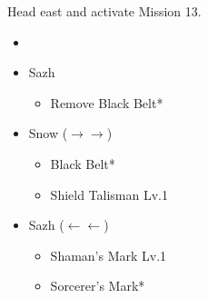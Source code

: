Head east and activate Mission 13.

\begin{menu}
	\begin{itemize}
		\paradigm
		\begin{itemize}
			\item {}%
				  {\paradigmline{\syn}{(\sab)}{\com}}%
			      {\paradigmline{\rav}{(\sab)}{(\sen)}}%
			      {\paradigmline[4]{\syn}{\med}{(\sen)}}%
			      {\paradigmline{(\com)}{(\med)}{(\sen)}}%
			      {\paradigmline{\com}{\rav}{\com}}%
			      {\paradigmline{(\com)}{(\sab)}{(\sen)}}
		\end{itemize}
		\equip
		\begin{itemize}
			\item Sazh
				\begin{itemize}
					\item Remove Black Belt*
				\end{itemize}
			\item Snow ($\rightarrow\rightarrow$)
			      \begin{itemize}
				      \item Black Belt*
				      \item Shield Talisman Lv.1
			      \end{itemize}
			\item Sazh ($\leftarrow\leftarrow$)
			      \begin{itemize}
				      \item Shaman's Mark Lv.1
				      \item Sorcerer's Mark*
			      \end{itemize}
		\end{itemize}
	\end{itemize}
\end{menu}

\renewcommand{\first}{[1] Bully (\syn/\sab/\com)}
\renewcommand{\second}{[2] Matador (\rav/\sab/\sen)}
\renewcommand{\third}{[3] Protection (\syn/\med/\sen)}
\renewcommand{\fourth}{[4] Solidarity (\com/\med/\sen)}
\renewcommand{\sixth}{[6] Dirty Fighting (\com/\sab/\sen)}

